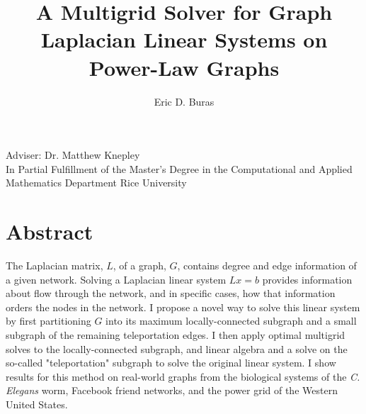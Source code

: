 \documentclass{article}
\begin{document}
\title{A Multigrid Solver for Graph Laplacian Linear Systems on Power-Law Graphs}
\author{Eric D. Buras}


\maketitle
\begin{center}
Adviser: Dr. Matthew Knepley\\
In Partial Fulfillment of the Master's Degree in the Computational and Applied Mathematics Department Rice University\\
\end{center}
\vspace{15 mm}
\section{Abstract}
\begin{spacing}{1}
The Laplacian matrix, $L$, of a graph, $G$, contains degree and edge information of a given network. Solving a Laplacian linear system $Lx = b$ provides information about flow through the network, and in specific cases, how that information orders the nodes in the network. I propose a novel way to solve this linear system by first partitioning $G$ into its maximum locally-connected subgraph and a small subgraph of the remaining teleportation edges. I then apply optimal multigrid solves to the locally-connected subgraph, and linear algebra and a solve on the so-called "teleportation" subgraph to solve the original linear system. I show results for this method on real-world graphs from the biological systems of the \textit{C. Elegans} worm, Facebook friend networks, and the power grid of the Western United States.
\end{spacing}

%
%
\end{document}
